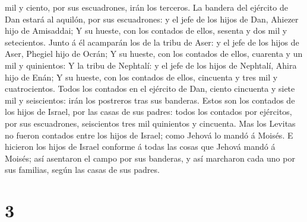mil y ciento, por sus escuadrones, irán los terceros.  La
bandera del ejército de Dan estará al aquilón, por sus escuadrones: y el
jefe de los hijos de Dan, Ahiezer hijo de Amisaddai;  Y su
hueste, con los contados de ellos, sesenta y dos mil y setecientos.
 Junto á él acamparán los de la tribu de Aser: y el jefe de
los hijos de Aser, Phegiel hijo de Ocrán;  Y su hueste, con
los contados de ellos, cuarenta y un mil y quinientos:  Y
la tribu de Nephtalí: y el jefe de los hijos de Nephtalí, Ahira hijo de
Enán;  Y su hueste, con los contados de ellos, cincuenta y
tres mil y cuatrocientos.  Todos los contados en el
ejército de Dan, ciento cincuenta y siete mil y seiscientos: irán los
postreros tras sus banderas.  Estos son los contados de los
hijos de Israel, por las casas de sus padres: todos los contados por
ejércitos, por sus escuadrones, seiscientos tres mil quinientos y
cincuenta.  Mas los Levitas no fueron contados entre los
hijos de Israel; como Jehová lo mandó á Moisés.  E hicieron
los hijos de Israel conforme á todas las cosas que Jehová mandó á
Moisés; así asentaron el campo por sus banderas, y así marcharon cada
uno por sus familias, según las casas de sus padres.

\hypertarget{section-2}{%
\section{3}\label{section-2}}


